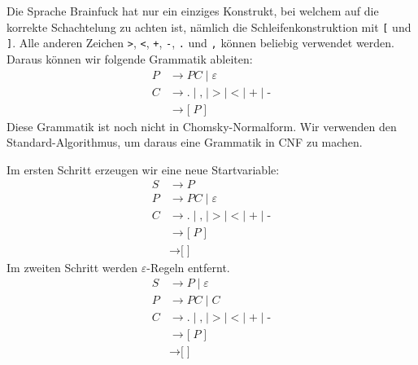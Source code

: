 \begin{loesung}
Die Sprache Brainfuck hat nur ein einziges Konstrukt, bei welchem
auf die korrekte Schachtelung zu achten ist, nämlich die
Schleifenkonstruktion mit \texttt{[} und \texttt{]}.
Alle anderen Zeichen
\texttt{>},
\texttt{<},
\texttt{+},
\texttt{-},
\texttt{.}
und
\texttt{,}
können beliebig verwendet werden.
Daraus können wir folgende Grammatik ableiten:
\begin{align*}
P&\rightarrow P C\;|\;\varepsilon
\\
C&\rightarrow
\texttt{.} \;|\;
\texttt{,} \;|\;
\texttt{>} \;|\;
\texttt{<} \;|\;
\texttt{+} \;|\;
\texttt{-}
\\
&\rightarrow \texttt{[} \; P \; \texttt{]}
\end{align*}
Diese Grammatik ist noch nicht in Chomsky-Normalform.
Wir verwenden den Standard-Algorithmus, um daraus eine Grammatik in CNF
zu machen.

Im ersten Schritt erzeugen wir eine neue Startvariable:
\begin{align*}
S&\rightarrow P\\
P&\rightarrow P C\;|\;\varepsilon
\\
C&\rightarrow
\texttt{.} \;|\;
\texttt{,} \;|\;
\texttt{>} \;|\;
\texttt{<} \;|\;
\texttt{+} \;|\;
\texttt{-}
\\
&\rightarrow \texttt{[} \; P \; \texttt{]}
\\
&\rightarrow \texttt{[} \; \texttt{]}
\end{align*}
Im zweiten Schritt werden $\varepsilon$-Regeln entfernt.
\begin{align*}
S&\rightarrow P
\;|\;\varepsilon
\\
P&\rightarrow P C \;|\; C
\\
C&\rightarrow
\texttt{.} \;|\;
\texttt{,} \;|\;
\texttt{>} \;|\;
\texttt{<} \;|\;
\texttt{+} \;|\;
\texttt{-}
\\
&\rightarrow \texttt{[} \; P \; \texttt{]}
\\
&\rightarrow \texttt{[} \; \texttt{]}
\end{align*}


\end{loesung}
